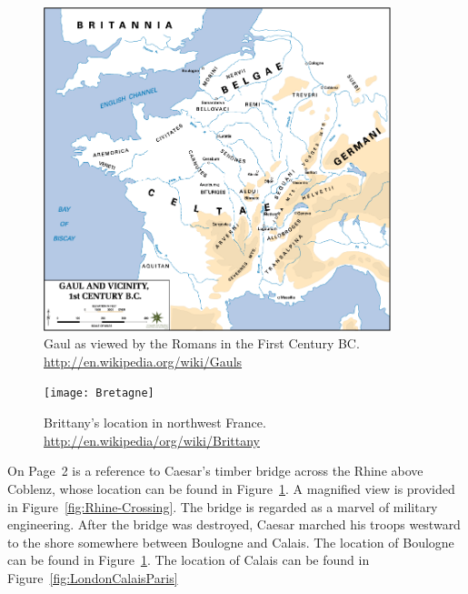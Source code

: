 \documentclass{book}
\begin{document}
\begin{figure}
   \begin{center}
      \includegraphics[width=0.9\textwidth]{images/Gaul-1st-century-BC}
      \caption{%
         Gaul as viewed by the Romans in the First Century BC\@.
         \url{http://en.wikipedia.org/wiki/Gauls}%
      }\label{fig:gaul-bc}
   \end{center}
\end{figure}

\begin{figure}
   \begin{center}
      \texttt{[image: Bretagne]}
      \caption{%
         Brittany's location in northwest France\@.
         \url{http://en.wikipedia/org/wiki/Brittany}
      }\label{fig:brittany}
   \end{center}
\end{figure}

On Page~2 is a reference to Caesar's timber bridge across the Rhine above
Coblenz, whose location can be found in Figure~\ref{fig:gaul-bc}. A magnified
view is provided in Figure~\ref{fig:Rhine-Crossing}. The bridge is regarded as
a marvel of military engineering. After the bridge was destroyed, Caesar
marched his troops westward to the shore somewhere between Boulogne and Calais.
The location of Boulogne can be found in Figure~\ref{fig:gaul-bc}. The location of
Calais can be found in Figure~\ref{fig:LondonCalaisParis}
\end{document}
